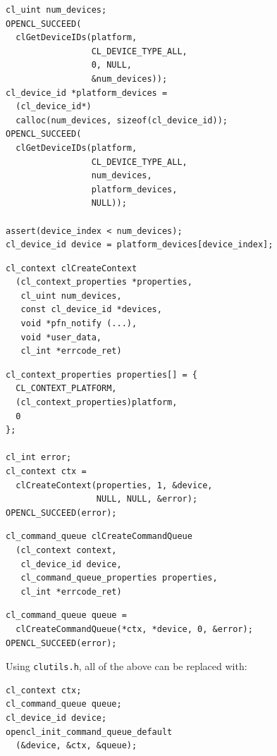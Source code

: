 \documentclass{beamer}
\begin{document}
\begin{frame}[fragile]
\begin{lstlisting}
cl_uint num_devices;
OPENCL_SUCCEED(
  clGetDeviceIDs(platform,
                 CL_DEVICE_TYPE_ALL,
                 0, NULL,
                 &num_devices));
cl_device_id *platform_devices =
  (cl_device_id*)
  calloc(num_devices, sizeof(cl_device_id));
OPENCL_SUCCEED(
  clGetDeviceIDs(platform,
                 CL_DEVICE_TYPE_ALL,
                 num_devices,
                 platform_devices,
                 NULL));

assert(device_index < num_devices);
cl_device_id device = platform_devices[device_index];
\end{lstlisting}
\end{frame}

\begin{frame}[fragile]

\begin{lstlisting}[backgroundcolor=\color{lightgray}]
cl_context clCreateContext
  (cl_context_properties *properties,
   cl_uint num_devices,
   const cl_device_id *devices,
   void *pfn_notify (...),
   void *user_data,
   cl_int *errcode_ret)
\end{lstlisting}

\begin{lstlisting}
cl_context_properties properties[] = {
  CL_CONTEXT_PLATFORM,
  (cl_context_properties)platform,
  0
};

cl_int error;
cl_context ctx =
  clCreateContext(properties, 1, &device,
                  NULL, NULL, &error);
OPENCL_SUCCEED(error);
\end{lstlisting}
\end{frame}

\begin{frame}

\begin{lstlisting}[backgroundcolor=\color{lightgray}]
cl_command_queue clCreateCommandQueue
  (cl_context context,
   cl_device_id device,
   cl_command_queue_properties properties,
   cl_int *errcode_ret)
\end{lstlisting}

\begin{lstlisting}
cl_command_queue queue =
  clCreateCommandQueue(*ctx, *device, 0, &error);
OPENCL_SUCCEED(error);
\end{lstlisting}

  Using \texttt{clutils.h}, all of the above can be replaced with:

\begin{lstlisting}
cl_context ctx;
cl_command_queue queue;
cl_device_id device;
opencl_init_command_queue_default
  (&device, &ctx, &queue);
\end{lstlisting}

\end{frame}
\end{document}
